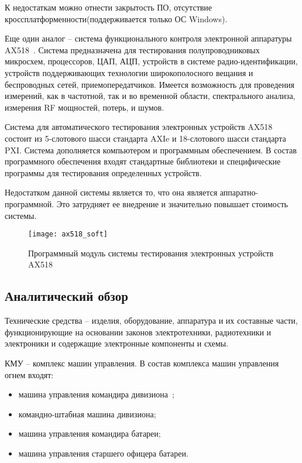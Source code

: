 К недостаткам можно отнести закрытость ПО, отсутствие кроссплатформенности(поддерживается только ОС Windows).

Еще один аналог -- система функционального контроля электронной аппаратуры AX518~\cite{AX518}. Система предназначена для тестирования полупроводниковых микросхем, процессоров, ЦАП, АЦП, устройств в системе радио-идентификации, устройств поддерживающих технологии широкополосного вещания и беспроводных сетей, приемопередатчиков.
Имеется возможность для проведения измерений, как в частотной, так и во временной области, спектрального анализа, измерения RF мощностей, потерь, и шумов.

Система для автоматического тестирования электронных устройств \break AX518 состоит из 5-слотового шасси стандарта AXIe и 18-слотового шасси стандарта PXI.
Система дополняется компьютером и программным обеспечением.
В состав программного обеспечения входят стандартные библиотеки и специфические программы для тестирования определенных устройств.

Недостатком данной системы является то, что она является аппаратно-программной. Это затрудняет ее внедрение и
значительно повышает стоимость системы.

\begin{figure}[ht]
	\centering
	\texttt{[image: ax518\_soft]}
	\caption{Программный модуль системы тестирования электронных устройств AX518~\cite{AX518}}
	\label{fig:lit_reiview:analogues:ax518_soft}
\end{figure}

\subsection{Аналитический обзор}
\label{sub:lit_review:analitics}
Технические средства --  изделия, оборудование, аппаратура и их составные части, функционирующие на основании законов электротехники, радиотехники и электроники и содержащие электронные компоненты и схемы.

КМУ -- комплекс машин управления.
В состав комплекса машин управления огнем входят:
\begin{itemize}
	\item машина управления командира дивизиона~\cite{div_car};
	\item командно-штабная машина дивизиона;
	\item машина управления командира батареи;
	\item машина управления старшего офицера батареи.
\end{itemize}

